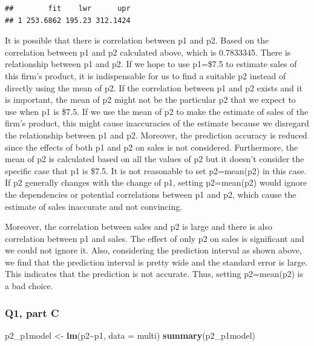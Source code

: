 \documentclass[
]{article}
\newenvironment{Shaded}{\begin{snugshade}}{\end{snugshade}}
\newcommand{\AttributeTok}[1]{\textcolor[rgb]{0.13,0.29,0.53}{#1}}
\newcommand{\FunctionTok}[1]{\textcolor[rgb]{0.13,0.29,0.53}{\textbf{#1}}}
\newcommand{\NormalTok}[1]{#1}
\newcommand{\OtherTok}[1]{\textcolor[rgb]{0.56,0.35,0.01}{#1}}
\newcommand{\SpecialCharTok}[1]{\textcolor[rgb]{0.81,0.36,0.00}{\textbf{#1}}}
\begin{document}
\begin{verbatim}
##        fit    lwr      upr
## 1 253.6862 195.23 312.1424
\end{verbatim}

It is possible that there is correlation between p1 and p2. Based on the
correlation between p1 and p2 calculated above, which is 0.7833345.
There is relationship between p1 and p2. If we hope to use p1=\$7.5 to
estimate sales of this firm's product, it is indispensable for us to
find a suitable p2 instead of directly using the mean of p2. If the
correlation between p1 and p2 exists and it is important, the mean of p2
might not be the particular p2 that we expect to use when p1 is \$7.5.
If we use the mean of p2 to make the estimate of sales of the firm's
product, this might cause inaccuracies of the estimate because we
disregard the relationship between p1 and p2. Moreover, the prediction
accuracy is reduced since the effects of both p1 and p2 on sales is not
considered. Furthermore, the mean of p2 is calculated based on all the
values of p2 but it doesn't consider the specific case that p1 is \$7.5.
It is not reasonable to set p2=mean(p2) in this case. If p2 generally
changes with the change of p1, setting p2=mean(p2) would ignore the
dependencies or potential correlations between p1 and p2, which cause
the estimate of sales inaccurate and not convincing.

Moreover, the correlation between sales and p2 is large and there is
also correlation between p1 and sales. The effect of only p2 on sales is
significant and we could not ignore it. Also, considering the prediction
interval as shown above, we find that the prediction interval is pretty
wide and the standard error is large. This indicates that the prediction
is not accurate. Thus, setting p2=mean(p2) is a bad choice.

\subsubsection{Q1, part C}\label{q1-part-c}

\begin{Shaded}
\begin{Highlighting}[]
\NormalTok{p2\_p1model }\OtherTok{\textless{}{-}} \FunctionTok{lm}\NormalTok{(p2}\SpecialCharTok{\textasciitilde{}}\NormalTok{p1, }\AttributeTok{data =}\NormalTok{ multi)}
\FunctionTok{summary}\NormalTok{(p2\_p1model)}
\end{Highlighting}
\end{Shaded}
\end{document}
